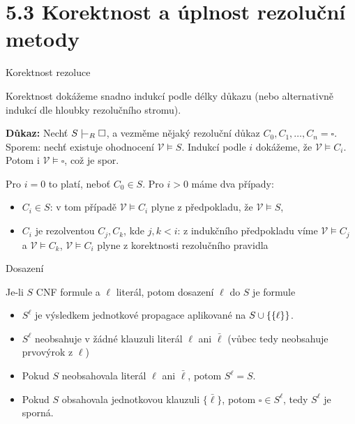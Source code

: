 \documentclass{beamer}
\begin{document}
\section{5.3 Korektnost a úplnost rezoluční metody}


\begin{frame}{Korektnost rezoluce}
    
    Korektnost dokážeme snadno indukcí podle délky důkazu (nebo alternativně indukcí dle hloubky rezolučního stromu).


    \textbf{Důkaz:} Nechť $S\proves_R\square$, a vezměme nějaký rezoluční důkaz $C_0,C_1,\dots,C_n=\square$. \alert{Sporem:} nechť existuje ohodnocení $\mathcal V\models S$. Indukcí podle $i$ dokážeme, že \alert{$\mathcal V\models C_i$}. Potom i $\mathcal V\models \square$, což je spor. 
    
    Pro $i=0$ to platí, neboť $C_0\in S$. Pro $i>0$ máme dva případy:
    \begin{itemize}
        \item \alert{$C_i\in S$:} v tom případě $\mathcal V\models C_i$ plyne z předpokladu, že $\mathcal V\models S$,
        \item \alert{$C_i$ je rezolventou $C_j,C_k$, kde $j,k<i$:} z indukčního předpokladu víme $\mathcal V\models C_j$ a $\mathcal V\models C_k$, $\mathcal V\models C_i$ plyne z korektnosti rezolučního pravidla\hfill\qedsymbol
    \end{itemize}

\end{frame}


\begin{frame}{Dosazení}

    
    Je-li $S$ CNF formule a $\ell$ literál, potom \alert{dosazení} $\ell$ do $S$ je formule
        
    \begin{itemize}
        \item $S^\ell$ je výsledkem \alert{jednotkové propagace} aplikované na $S\mathbin{\cup}\{\{\ell\}\}$.
        \item $S^\ell$ neobsahuje v žádné klauzuli literál $\ell$ ani $\bar\ell$ (vůbec tedy neobsahuje prvovýrok z $\ell$)
        \item Pokud $S$ neobsahovala literál $\ell$ ani $\bar\ell$, potom $S^\ell=S$.
        \item Pokud $S$ obsahovala jednotkovou klauzuli $\{\bar\ell\}$, potom $\square\in S^\ell$, tedy $S^\ell$ je sporná.
    \end{itemize} 

\end{frame}
\end{document}
